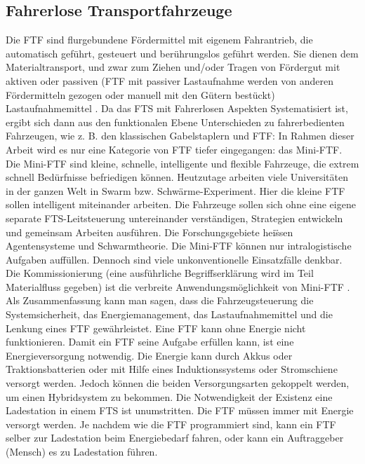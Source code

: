 \subsection{Fahrerlose Transportfahrzeuge}
Die FTF sind flurgebundene F\"ordermittel mit eigenem Fahrantrieb, die automatisch gef\"uhrt, gesteuert und ber\"uhrungslos gef\"uhrt werden. Sie dienen dem Materialtransport, und zwar zum Ziehen und/oder Tragen von F\"ordergut mit aktiven oder passiven (FTF mit passiver Lastaufnahme werden von anderen F\"ordermitteln gezogen oder manuell mit den G\"utern best\"uckt) Lastaufnahmemittel \cite{Verein:Deutscher:Ingenieure:2510}. Da das FTS mit Fahrerlosen Aspekten Systematisiert ist, ergibt sich dann aus den funktionalen Ebene Unterschieden zu fahrerbedienten Fahrzeugen, wie z. B. den klassischen Gabelstaplern und FTF: In Rahmen dieser Arbeit wird es nur eine Kategorie von FTF tiefer eingegangen: das Mini-FTF. Die Mini-FTF sind kleine, schnelle, intelligente und flexible Fahrzeuge, die extrem schnell Bed\"urfnisse befriedigen k\"onnen. Heutzutage arbeiten viele Universit\"aten in der ganzen Welt in Swarm bzw. Schw\"arme-Experiment. Hier die kleine FTF sollen intelligent miteinander arbeiten. Die Fahrzeuge sollen sich ohne eine eigene separate FTS-Leitsteuerung untereinander verst\"andigen, Strategien entwickeln und gemeinsam Arbeiten ausf\"uhren. Die Forschungsgebiete hei\"ssen Agentensysteme und Schwarmtheorie. Die Mini-FTF k\"onnen nur intralogistische Aufgaben auff\"ullen. Dennoch sind viele unkonventionelle Einsatzf\"alle denkbar. Die Kommissionierung (eine ausf\"uhrliche Begriffserkl\"arung wird im Teil Materialfluss gegeben) ist die verbreite Anwendungsm\"oglichkeit von Mini-FTF \cite[S. 105]{Guenther:2011}.
Als Zusammenfassung kann man sagen, dass die Fahrzeugsteuerung die Systemsicherheit, das Energiemanagement, das Lastaufnahmemittel und die Lenkung eines FTF gew\"ahrleistet. Eine FTF kann ohne Energie nicht funktionieren. Damit ein FTF seine Aufgabe erf\"ullen kann, ist eine Energieversorgung notwendig. Die Energie kann durch Akkus oder Traktionsbatterien oder mit Hilfe eines Induktionssystems oder Stromschiene versorgt werden. Jedoch k\"onnen die beiden Versorgungsarten gekoppelt werden, um einen Hybridsystem zu bekommen. Die Notwendigkeit der Existenz eine Ladestation in einem FTS ist unumstritten. Die FTF m\"ussen immer mit Energie versorgt werden. Je nachdem wie die FTF programmiert sind, kann ein FTF selber zur Ladestation beim Energiebedarf fahren, oder kann ein Auftraggeber (Mensch) es zu Ladestation f\"uhren.
